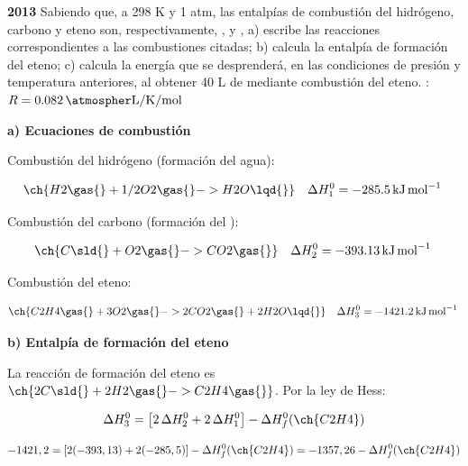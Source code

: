 \begin{exerciseEVAU}
    \textbf{2013} Sabiendo que, a 298 K y 1 atm, las entalpías de combustión del hidrógeno, carbono y eteno son,
    respectivamente, ,   y , a) escribe las reacciones correspondientes a las combustiones citadas; b) calcula la entalpía de formación del eteno; c) calcula la energía que se desprenderá, en las condiciones de presión y temperatura anteriores, al obtener 40 L de  mediante combustión del eteno.
    \datos{}: \(R = \ctegases\)

    \begin{solu}

        \textbf{a) Ecuaciones de combustión}

        Combustión del hidrógeno (formación del agua):

        \begin{equation*}
            \ch{H2 \gas{} + 1/2 O2 \gas{} -> H2O \lqd{}} \quad \Delta H^0_1 = \energia[kjmol]{-285.5}
        \end{equation*}

        Combustión del carbono (formación del ):

        \begin{equation*}
            \ch{C \sld{} + O2 \gas{} -> CO2 \gas{}} \quad \Delta H^0_2 = \energia[kjmol]{-393.13}
        \end{equation*}

        Combustión del eteno:

        \begin{equation*}
            \ch{C2H4 \gas{} + 3 O2 \gas{} -> 2 CO2 \gas{} + 2 H2O \lqd{}} \quad \Delta H^0_3 = \energia[kjmol]{-1421.2}
        \end{equation*}

        \textbf{b) Entalpía de formación del eteno}

        La reacción de formación del eteno es \(\ch{2 C \sld{} + 2 H2 \gas{} -> C2H4 \gas{}}\). Por la ley de Hess:

        \begin{equation*}
            \Delta H^0_3 = \left[ 2\, \Delta H^0_2 + 2\, \Delta H^0_1 \right] - \Delta H^0_f (\ch{C2H4})
        \end{equation*}

        \begin{equation*}
            -1421,2 = \left[ 2(-393,13) + 2(-285,5) \right] - \Delta H^0_f (\ch{C2H4}) = -1357,26 - \Delta H^0_f (\ch{C2H4})
        \end{equation*}


\end{solu}
\end{exerciseEVAU}
